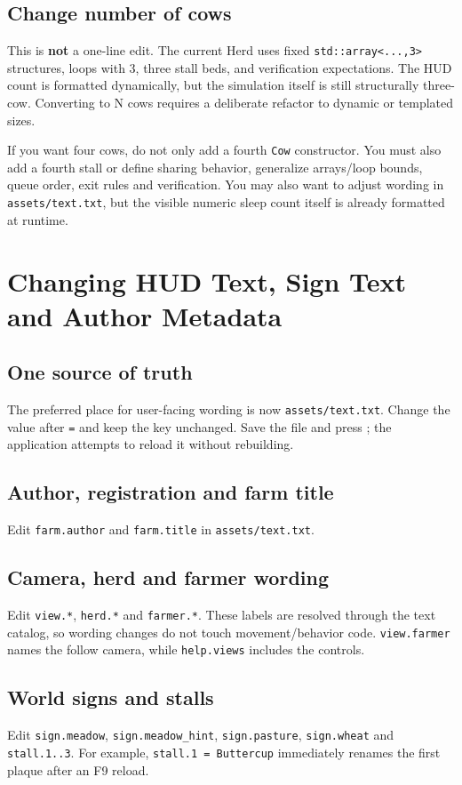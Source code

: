 \documentclass[11pt,a4paper,openany]{book}
\newcommand{\code}[1]{\texttt{#1}}
\newcommand{\file}[1]{\nolinkurl{#1}}
\newcommand{\keycap}[1]{\begingroup\setlength{\fboxsep}{0.8pt}\raisebox{0.05ex}{\fbox{\footnotesize\texttt{#1}}}\endgroup}
\begin{document}
\section{Change number of cows}
This is \textbf{not} a one-line edit. The current Herd uses fixed \code{std::array<...,3>} structures, loops with 3, three stall beds, and verification expectations. The HUD count is formatted dynamically, but the simulation itself is still structurally three-cow. Converting to N cows requires a deliberate refactor to dynamic or templated sizes.

\begin{warningbox}
	If you want four cows, do not only add a fourth \code{Cow} constructor. You must also add a fourth stall or define sharing behavior, generalize arrays/loop bounds, queue order, exit rules and verification. You may also want to adjust wording in \file{assets/text.txt}, but the visible numeric sleep count itself is already formatted at runtime.
\end{warningbox}

\chapter{Changing HUD Text, Sign Text and Author Metadata}
\section{One source of truth}
The preferred place for user-facing wording is now \file{assets/text.txt}. Change the value after \code{=} and keep the key unchanged. Save the file and press \keycap{F9}; the application attempts to reload it without rebuilding.

\section{Author, registration and farm title}
Edit \code{farm.author} and \code{farm.title} in \file{assets/text.txt}.

\section{Camera, herd and farmer wording}
Edit \code{view.*}, \code{herd.*} and \code{farmer.*}. These labels are resolved through the text catalog, so wording changes do not touch movement/behavior code. \code{view.farmer} names the follow camera, while \code{help.views} includes the \keycap{J/U} controls.

\section{World signs and stalls}
Edit \code{sign.meadow}, \code{sign.meadow_hint}, \code{sign.pasture}, \code{sign.wheat} and \code{stall.1..3}. For example, \code{stall.1 = Buttercup} immediately renames the first plaque after an F9 reload.
\end{document}
